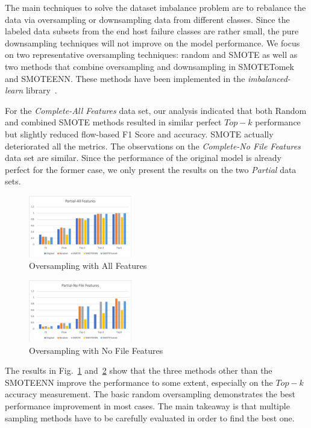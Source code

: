 The main techniques to solve the dataset imbalance problem are to rebalance the data via oversampling or downsampling data from different classes. Since the labeled data subsets from the end host failure classes are rather small, the pure downsampling techniques will not improve on the model performance. We focus on two representative oversampling techniques: random and SMOTE as well as two methods that combine oversampling and downsampling in SMOTETomek and SMOTEENN.
These methods have been implemented in the {\it imbalanced-learn} library~\cite{imbalance-learn:web}.

For the  {\it Complete-All Features} data set, our analysis indicated that both Random and combined SMOTE methods resulted in similar perfect $Top-k$ performance but slightly reduced flow-based F1 Score and accuracy. SMOTE actually deteriorated all the metrics. The observations on the  {\it Complete-No File Features} data set are similar. Since the performance of the original model is already perfect for the former case, we only present the results on the two {\it Partial} data sets.

\begin{figure}[!ht]
\begin{center}
\includegraphics[width=0.4\textwidth]{./figure/partial-all-oversampling}
\end{center}
\vspace{-0.1in}
\caption{Oversampling with All Features}
\label{fig:os:all}
\vspace{-0.2in}
\end{figure}

\begin{figure}[!ht]
\begin{center}
\includegraphics[width=0.4\textwidth]{./figure/partial-nofile-oversampling}
\end{center}
\vspace{-0.1in}
\caption{Oversampling with No File Features}
\label{fig:os:nofile}
\vspace{-0.1in}
\end{figure}

The results in Fig.~\ref{fig:os:all} and~\ref{fig:os:nofile} show that the three methods other than the SMOTEENN improve the performance to some extent, especially on the $Top-k$ accuracy measurement. The basic random oversampling demonstrates the best performance improvement in most cases.  The main takeaway is that multiple sampling methods have to be carefully evaluated in order to find the best one.
